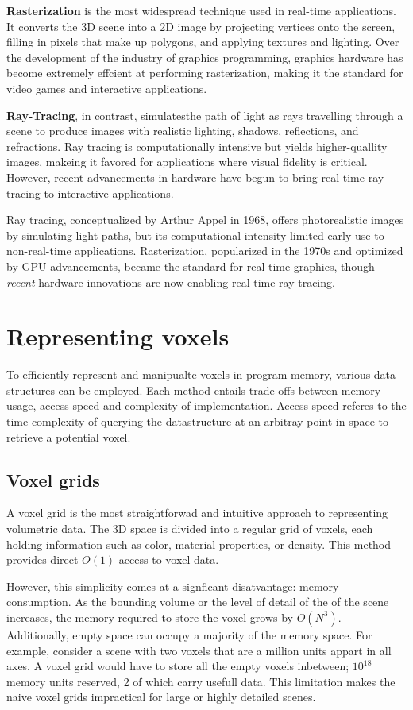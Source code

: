 \textbf{Rasterization} is the most widespread technique  used in real-time applications.
It converts the 3D scene into a 2D image by projecting vertices onto the screen, filling in pixels that make up polygons, and applying textures and lighting.
Over the development of the industry of graphics programming, graphics hardware has become extremely effcient at performing rasterization, making it the standard for video games and interactive applications.

\textbf{Ray-Tracing}, in contrast, simulatesthe path of light as rays travelling through a scene to produce images with realistic lighting, shadows, reflections, and refractions. Ray tracing is computationally intensive but yields higher-quallity images, makeing it favored for applications where visual fidelity is critical. However, recent advancements in hardware have begun to bring real-time ray tracing to interactive applications.

Ray tracing, conceptualized by Arthur Appel in 1968\supercite{appel}, offers photorealistic images by simulating light paths, but its computational intensity limited early use to non-real-time applications. Rasterization, popularized in the 1970s and optimized by GPU advancements, became the standard for real-time graphics, though \emph{recent} hardware innovations are now enabling real-time ray tracing.

\section{Representing voxels}
To efficiently represent and manipualte voxels in program memory, various data structures can be employed. Each method entails trade-offs between memory usage, access speed and complexity of implementation. Access speed referes to the time complexity of querying the datastructure at an arbitray point in space to retrieve a potential voxel.

\subsection{Voxel grids}
A voxel grid is the most straightforwad and intuitive approach to representing volumetric data. The 3D space is divided into a regular grid of voxels, each holding information such as color, material properties, or density. This method provides direct $O(1)$ access to voxel data.

However, this simplicity comes at a signficant disatvantage: memory consumption.
As the bounding volume or the level of detail of the of the scene increases, the memory required to store the voxel grows by $O(N^{3})$.
Additionally, empty space can occupy a majority of the memory space.
For example, consider a scene with two voxels that are a million units appart in all axes.
A voxel grid would have to store all the empty voxels inbetween; $10^{18}$ memory units reserved, 2 of which carry usefull data.
This limitation makes the naive voxel grids impractical for large or highly detailed scenes.

